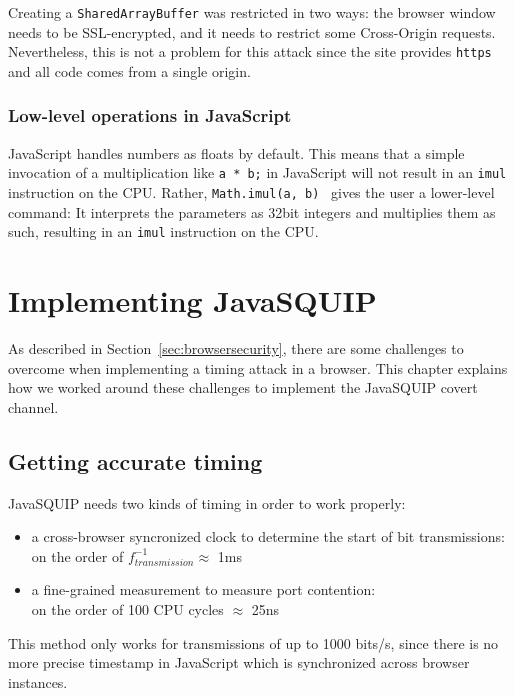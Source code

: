 \documentclass[11pt,
  titlepage=false,
]{scrreprt}
\begin{document}
Creating a \texttt{SharedArrayBuffer} was restricted in two ways: the browser window needs to be SSL-encrypted, and it needs to restrict some Cross-Origin requests.
Nevertheless, this is not a problem for this attack since the site provides \texttt{https} and all code comes from a single origin.


\subsection{Low-level operations in JavaScript}\label{subsec:lowleveljs}
JavaScript handles numbers as floats by default.
This means that a simple invocation of a multiplication like \texttt{a * b;} in JavaScript will not result in an \texttt{imul} instruction on the CPU.
Rather, \texttt{Math.imul(a, b)}~\cite{mathimul} gives the user a lower-level command:
It interprets the parameters as 32bit integers and multiplies them as such, resulting in an \texttt{imul} instruction on the CPU.


\chapter{Implementing JavaSQUIP}
\label{ch:implementation}
As described in Section~\ref{sec:browsersecurity}, there are some challenges to overcome when implementing a timing attack in a browser.
This chapter explains how we worked around these challenges to implement the JavaSQUIP covert channel.

\section{Getting accurate timing}
\label{sec:accurate-timing}
JavaSQUIP needs two kinds of timing in order to work properly:
\begin{itemize}
    \item a cross-browser syncronized clock to determine the start of bit transmissions:\\
    on the order of $f_{transmission}^{-1} \approx$ 1ms
    \item a fine-grained measurement to measure port contention:\\
    on the order of 100 CPU cycles $\approx$ 25ns
\end{itemize}

This method only works for transmissions of up to 1000 bits/s, since there is no more precise timestamp in JavaScript which is synchronized across browser instances.
\end{document}
